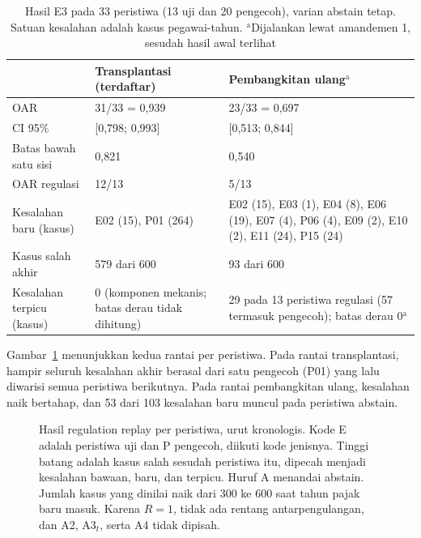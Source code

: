 \documentclass[conference]{IEEEtran}
\makeatletter
\DeclareRobustCommand{\en}[1]{{\usefont{\f@encoding}{\f@family}{\f@series}{it}#1\/}}
\makeatother
\begin{document}
\begin{table}[t]
\centering
\caption{Hasil E3 pada 33 peristiwa (13 uji dan 20 pengecoh), varian \en{abstain} tetap. Satuan kesalahan adalah kasus pegawai-tahun. $^{\mathrm{a}}$Dijalankan lewat amandemen 1, sesudah hasil awal terlihat}
\label{tab:e3}
\scriptsize
\setlength{\tabcolsep}{3pt}
\begin{tabularx}{\columnwidth}{@{}L P{1.75cm} P{2.45cm}@{}}
\toprule
& \textbf{Transplantasi (terdaftar)} & \textbf{Pembangkitan ulang$^{\mathrm{a}}$} \\
\midrule
OAR & 31/33 = 0,939 & 23/33 = 0,697 \\
CI 95\% & [0,798; 0,993] & [0,513; 0,844] \\
Batas bawah satu sisi & 0,821 & 0,540 \\
OAR regulasi & 12/13 & 5/13 \\
Kesalahan baru (kasus) & E02 (15), P01 (264) & E02 (15), E03 (1), E04 (8), E06 (19), E07 (4), P06 (4), E09 (2), E10 (2), E11 (24), P15 (24) \\
Kasus salah akhir & 579 dari 600 & 93 dari 600 \\
Kesalahan terpicu (kasus) & 0 (komponen mekanis; batas derau tidak dihitung) & 29 pada 13 peristiwa regulasi (57 termasuk pengecoh); batas derau 0$^{\mathrm{a}}$ \\
\bottomrule
\end{tabularx}
\end{table}

Gambar~\ref{fig:replay} menunjukkan kedua rantai per peristiwa. Pada rantai transplantasi, hampir seluruh kesalahan akhir berasal dari satu pengecoh (P01) yang lalu diwarisi semua peristiwa berikutnya. Pada rantai pembangkitan ulang, kesalahan naik bertahap, dan 53 dari 103 kesalahan baru muncul pada peristiwa \en{abstain}.

\begin{figure}[t]
\centering

\caption{Hasil \en{regulation replay} per peristiwa, urut kronologis. Kode E adalah peristiwa uji dan P pengecoh, diikuti kode jenisnya. Tinggi batang adalah kasus salah sesudah peristiwa itu, dipecah menjadi kesalahan bawaan, baru, dan terpicu. Huruf A menandai \en{abstain}. Jumlah kasus yang dinilai naik dari 300 ke 600 saat tahun pajak baru masuk. Karena $R = 1$, tidak ada rentang antarpengulangan, dan A2, A3$_t$, serta A4 tidak dipisah.}
\label{fig:replay}
\end{figure}
\end{document}
